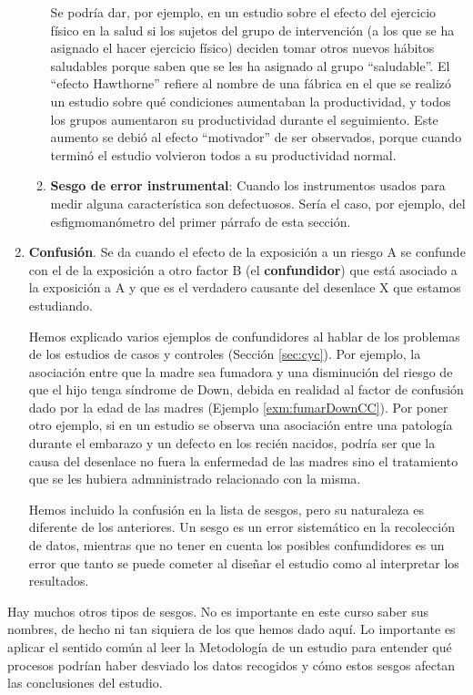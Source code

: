 \documentclass[
]{book}
\theoremstyle{definition}
\theoremstyle{definition}
\theoremstyle{definition}
\theoremstyle{definition}
\theoremstyle{remark}
\begin{document}
\begin{enumerate}
\begin{enumerate}
    Se podría dar, por ejemplo, en un estudio sobre el efecto del ejercicio físico en la salud si los sujetos del grupo de intervención (a los que se ha asignado el hacer ejercicio físico) deciden tomar otros nuevos hábitos saludables porque saben que se les ha asignado al grupo ``saludable''. El ``efecto Hawthorne'' refiere al nombre de una fábrica en el que se realizó un estudio sobre qué condiciones aumentaban la productividad, y todos los grupos aumentaron su productividad durante el seguimiento. Este aumento se debió al efecto ``motivador'' de ser observados, porque cuando terminó el estudio volvieron todos a su productividad normal.
  \item
    \textbf{Sesgo de error instrumental}: Cuando los instrumentos usados para medir alguna característica son defectuosos. Sería el caso, por ejemplo, del esfigmomanómetro del primer párrafo de esta sección.
  \end{enumerate}
\item
  \textbf{Confusión}. Se da cuando el efecto de la exposición a un riesgo A se confunde con el de la exposición a otro factor B (el \textbf{confundidor}) que está asociado a la exposición a A y que es el verdadero causante del desenlace X que estamos estudiando.

  Hemos explicado varios ejemplos de confundidores al hablar de los problemas de los estudios de casos y controles (Sección \ref{sec:cyc}). Por ejemplo, la asociación entre que la madre sea fumadora y una disminución del riesgo de que el hijo tenga síndrome de Down, debida en realidad al factor de confusión dado por la edad de las madres (Ejemplo \ref{exm:fumarDownCC}). Por poner otro ejemplo, si en un estudio se observa una asociación entre una patología durante el embarazo y un defecto en los recién nacidos, podría ser que la causa del desenlace no fuera la enfermedad de las madres sino el tratamiento que se les hubiera admninistrado relacionado con la misma.

  Hemos incluido la confusión en la lista de sesgos, pero su naturaleza es diferente de los anteriores. Un sesgo es un error sistemático en la recolección de datos, mientras que no tener en cuenta los posibles confundidores es un error que tanto se puede cometer al diseñar el estudio como al interpretar los resultados.
\end{enumerate}

Hay muchos otros tipos de sesgos. No es importante en este curso saber sus nombres, de hecho ni tan siquiera de los que hemos dado aquí. Lo importante es aplicar el sentido común al leer la Metodología de un estudio para entender qué procesos podrían haber desviado los datos recogidos y cómo estos sesgos afectan las conclusiones del estudio.
\end{document}
